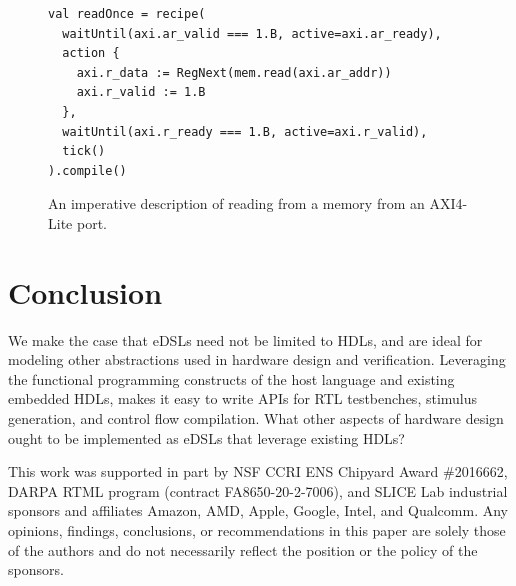 \documentclass[sigplan,review,nonacm,9pt]{acmart}
\begin{document}
\begin{figure}
\begin{verbatim}
val readOnce = recipe(
  waitUntil(axi.ar_valid === 1.B, active=axi.ar_ready),
  action {
    axi.r_data := RegNext(mem.read(axi.ar_addr))
    axi.r_valid := 1.B
  },
  waitUntil(axi.r_ready === 1.B, active=axi.r_valid),
  tick()
).compile()
\end{verbatim}
\caption{An imperative description of reading from a memory from an AXI4-Lite port.}
\label{fig:recipes}
\end{figure}

\section{Conclusion}


We make the case that eDSLs need not be limited to HDLs, and are ideal for modeling other abstractions used in hardware design and verification.
Leveraging the functional programming constructs of the host language and existing embedded HDLs, makes it easy to write APIs for RTL testbenches, stimulus generation, and control flow compilation.
What other aspects of hardware design ought to be implemented as eDSLs that leverage existing HDLs?

\begin{acks}
This work was supported in part by NSF CCRI ENS Chipyard Award \#2016662, DARPA RTML program (contract FA8650-20-2-7006), and SLICE Lab industrial sponsors and affiliates Amazon, AMD, Apple, Google, Intel, and Qualcomm.
Any opinions, findings, conclusions, or recommendations in this paper are solely those of the authors and do not necessarily reflect the position or the policy of the sponsors.
\end{acks}




\end{document}
